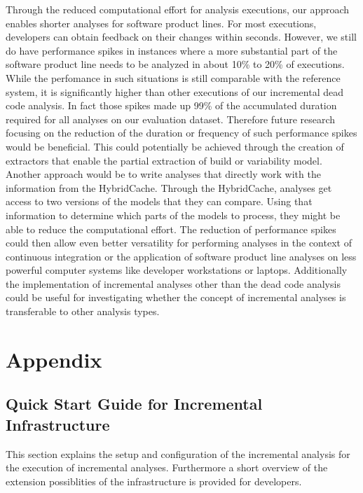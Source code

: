 \documentclass[a4paper]{article}
\begin{document}
Through the reduced computational effort for analysis executions, our approach enables shorter analyses for software product lines. For most executions, developers can obtain feedback on their changes within seconds. However, we still do have performance spikes in instances where a more substantial part of the software product line needs to be analyzed in about 10\% to 20\% of executions. While the perfomance in such situations is still comparable with the reference system, it is significantly higher than other executions of our incremental dead code analysis. In fact those spikes made up 99\% of the accumulated duration required for all analyses on our evaluation dataset. Therefore future research focusing on the reduction of the duration or frequency of such performance spikes would be beneficial. This could potentially be achieved through the creation of extractors that enable the partial extraction of build or variability model. Another approach would be to write analyses that directly work with the information from the HybridCache. Through the HybridCache, analyses get access to two versions of the models that they can compare. Using that information to determine which parts of the models to process, they might be able to reduce the computational effort. The reduction of performance spikes could then allow even better versatility for performing analyses in the context of continuous integration or the application of software product line analyses on less powerful computer systems like developer workstations or laptops.
Additionally the implementation of incremental analyses other than the dead code analysis could be useful for investigating whether the concept of incremental analyses is transferable to other analysis types.

\clearpage
\newpage



\clearpage
\newpage
\appendix
\section{Appendix}
\subsection{Quick Start Guide for Incremental Infrastructure}

This section explains the setup and configuration of the incremental analysis for the execution of incremental analyses. Furthermore a short overview of the extension possiblities of the infrastructure  is provided for developers.
\end{document}
